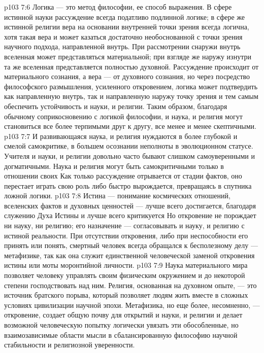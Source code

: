 \vs p103 7:6 Логика --- это метод философии, ее способ выражения. В сфере истинной науки рассуждение всегда податливо подлинной логике; в сфере же истинной религии вера на основании внутренней точки зрения всегда логична, хотя такая вера и может казаться достаточно необоснованной с точки зрения научного подхода, направленной внутрь. При рассмотрении снаружи внутрь вселенная может представляться материальной; при взгляде же наружу изнутри та же вселенная представляется полностью духовной. Рассуждение происходит от материального сознания, а вера --- от духовного сознания, но через посредство философского размышления, усиленного откровением, логика может подтвердить как направленную внутрь, так и направленную наружу точку зрения и тем самым обеспечить устойчивость и науки, и религии. Таким образом, благодаря обычному соприкосновению с логикой философии, и наука, и религия могут становиться все более терпимыми друг к другу, все менее и менее скептичными.
\vs p103 7:7 И развивающаяся наука, и религия нуждаются в более глубокой и смелой самокритике, в большем осознании неполноты в эволюционном статусе. Учителя и науки, и религии довольно часто бывают слишком самоуверенными и догматичными. Наука и религия могут быть самокритичными только в отношении своих  Как только рассуждение отрывается от стадии фактов, оно перестает играть свою роль либо быстро вырождается, превращаясь в спутника ложной логики.
\vs p103 7:8 \pc Истина --- понимание космических отношений, вселенских фактов и духовных ценностей --- лучше всего достигается, благодаря служению Духа Истины и лучше всего критикуется  Но откровение не порождает ни науку, ни религию; его назначение --- согласовывать и науку, и религию с истиной реальности. При отсутствии откровения, либо при неспособности его принять или понять, смертный человек всегда обращался к бесполезному делу --- метафизике, так как она служит единственной человеческой заменой откровения истины или моты моронтийной личности.
\vs p103 7:9 Наука материального мира позволяет человеку управлять своим физическим окружением и до некоторой степени господствовать над ним. Религия, основанная на духовном опыте, --- это источник братского порыва, который позволяет людям жить вместе в сложных условиях цивилизации научной эпохи. Метафизика, но еще более, несомненно, --- откровение, создает общую почву для открытий и науки, и религии и делает возможной человеческую попытку логически увязать эти обособленные, но взаимозависимые области мысли в сбалансированную философию научной стабильности и религиозной уверенности.
